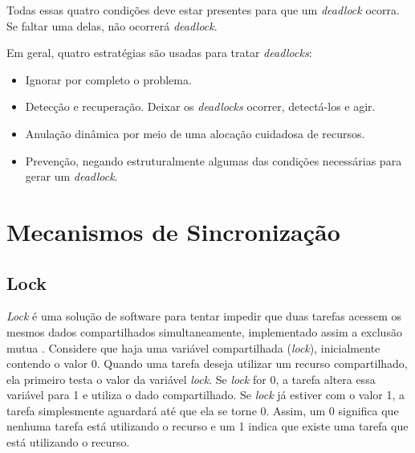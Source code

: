 Todas essas quatro condições deve estar presentes para que um
\textit{deadlock} ocorra. Se faltar uma delas, não ocorrerá
\textit{deadlock}.

Em geral, quatro estratégias são usadas para tratar \textit{deadlocks}:

\begin{itemize}
\item Ignorar por completo o problema.
\item Detecção e recuperação. Deixar os \textit{deadlocks} ocorrer,
detectá-los e agir.
\item Anulação dinâmica por meio de uma alocação cuidadosa de recursos.
\item Prevenção, negando estruturalmente algumas das condições necessárias
para gerar um \textit{deadlock}.
\end{itemize}

%
%
%

\section{Mecanismos de Sincronização}
\label{sec:mecanismo}

\subsection{Lock}

\textit{Lock} é uma solução de software para tentar impedir que duas
tarefas acessem os mesmos dados compartilhados simultaneamente,
implementado assim a exclusão mutua \cite{MCRT}. Considere que haja uma variável
compartilhada (\textit{lock}), inicialmente contendo o valor 0. Quando uma
tarefa deseja utilizar um recurso compartilhado, ela primeiro testa 
o valor da variável \textit{lock}. Se \textit{lock} for 0, a tarefa
altera essa variável para 1 e utiliza o dado compartilhado. Se \textit{lock}
já estiver com o valor 1, a tarefa simplesmente aguardará até que ela
se torne 0. Assim, um 0 significa que nenhuma tarefa está utilizando o
recurso e um 1 indica que existe uma tarefa que está utilizando o recurso.

